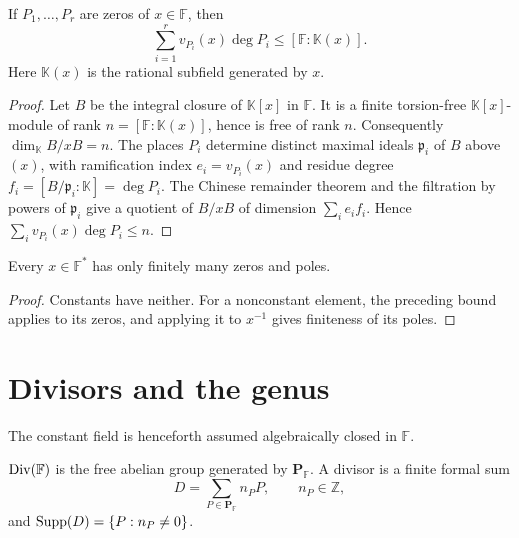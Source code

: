 \begin{theorem}
\label{par-thm-weighted-zero-bound}
\uses{}
If $P_1,\ldots,P_r$ are zeros of $x\in\mathbb F$, then
\[
\sum_{i=1}^r v_{P_i}(x)\deg P_i\leq[\mathbb F:\mathbb K(x)].
\]
Here $\mathbb K(x)$ is the rational subfield generated by $x$.
\end{theorem}
\begin{proof}
Let $B$ be the integral closure of $\mathbb K[x]$ in $\mathbb F$.  It is a
finite torsion-free $\mathbb K[x]$-module of rank
$n=[\mathbb F:\mathbb K(x)]$, hence is free of rank $n$.  Consequently
$\dim_{\mathbb K}B/xB=n$.  The places $P_i$ determine distinct maximal ideals
$\mathfrak p_i$ of $B$ above $(x)$, with ramification index
$e_i=v_{P_i}(x)$ and residue degree
$f_i=[B/\mathfrak p_i:\mathbb K]=\deg P_i$.  The Chinese remainder theorem
and the filtration by powers of $\mathfrak p_i$ give a quotient of $B/xB$ of
dimension $\sum_i e_if_i$.  Hence
$\sum_i v_{P_i}(x)\deg P_i\leq n$.
\end{proof}

\begin{corollary}
\label{par-cor-finite-zeros-poles}
\uses{}
Every $x\in\mathbb F^*$ has only finitely many zeros and poles.
\end{corollary}
\begin{proof}
Constants have neither. For a nonconstant element, the preceding bound applies
to its zeros, and applying it to $x^{-1}$ gives finiteness of its poles.
\end{proof}

\section{Divisors and the genus}
The constant field is henceforth assumed algebraically closed in $\mathbb F$.

\begin{definition}
\label{par-def-divisor}
\uses{}
$\operatorname{Div}(\mathbb F)$ is the free abelian group generated by
$\mathbf P_{\mathbb F}$. A divisor is a finite formal sum
\[
D=\sum_{P\in\mathbf P_{\mathbb F}}n_PP,\qquad n_P\in\mathbb Z,
\]
and $\operatorname{Supp}(D)=\{P:n_P\neq0\}$.
\end{definition}

